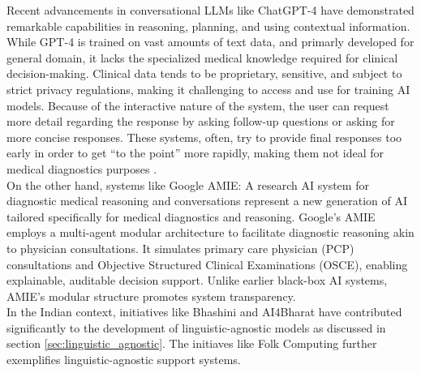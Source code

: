 \noindent Recent advancements in conversational LLMs like ChatGPT-4 have demonstrated remarkable capabilities in reasoning, planning, and using contextual information. While GPT-4 is trained on vast amounts of text data, and primarly developed for general domain, it lacks the specialized medical knowledge required for clinical decision-making. Clinical data tends to be proprietary, sensitive, and subject to strict privacy regulations, making it challenging to access and use for training AI models. Because of the interactive nature of the system, the user can request more detail regarding the response by asking follow-up questions or asking for more concise responses. These systems, often, try to provide final responses too early in order to get “to the point” more rapidly, making them not ideal for medical diagnostics purposes \cite{lee2023benefits}.\\[\baselineskip]


\noindent On the other hand, systems like Google AMIE: A research AI system for diagnostic medical reasoning and conversations \cite{karthikesalingam2024amie} represent a new generation of AI tailored specifically for medical diagnostics and reasoning. Google's AMIE employs a multi-agent modular architecture to facilitate diagnostic reasoning akin to physician consultations. It simulates primary care physician (PCP) consultations and Objective Structured Clinical Examinations (OSCE), enabling explainable, auditable decision support. Unlike earlier black-box AI systems, AMIE's modular structure promotes system transparency.\\[\baselineskip]

\noindent In the Indian context, initiatives like Bhashini and AI4Bharat have contributed significantly to the development of linguistic-agnostic models as discussed in section \ref{sec:linguistic_agnostic}. The initiaves like Folk Computing further exemplifies linguistic-agnostic support systems.\\[\baselineskip]

